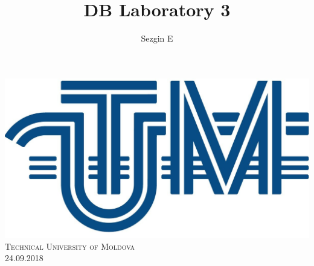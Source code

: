 \documentclass[12pt]{article}
\title{DB Laboratory 3}
\author{Sezgin E}
\begin{document}
        
        
        \begin{titlepage}
                \centering
                \vspace*{0.5 cm}
                \includegraphics[scale = 0.11]{LOGO_UTM.jpg}\\[1.0 cm]	%
                \textsc{\LARGE Technical University of Moldova}\\[2.0 cm]%
                \textsc{\Large 24.09.2018}\\[0.5 cm]		%


\end{titlepage}
\end{document}
